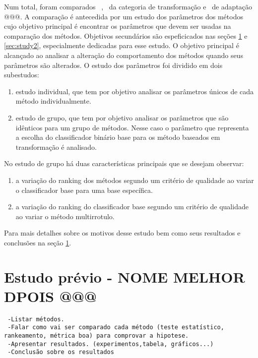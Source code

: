 Num total, foram comparados \Nml~\MML, \NmlT~da categoria de transformação e \NmlA~de adaptação @@@.
A comparação é antecedida por um estudo dos parâmetros dos métodos
cujo objetivo principal é encontrar os parâmetros que devem ser usadas na comparação dos métodos. Objetivos secundários são
espeficicados nas seções \ref{sec:study1} e \ref{sec:study2}, especialmente dedicadas para esse estudo.
O objetivo principal é alcançado ao analisar a alteração do comportamento dos métodos quando seus parâmetros são alterados.
O estudo dos parâmetros foi dividido em dois subestudos:
\begin{enumerate}
 \item estudo individual, que tem por objetivo analisar os parâmetros únicos de cada método individualmente.
  \item estudo de grupo, que tem por objetivo analisar os parâmetros que são idênticos para um grupo de métodos.
  Nesse caso o parâmetro que representa a escolha do classificador binário base para os método baseados em transformação é
  analisado. 
\end{enumerate}
 No estudo de grupo há duas características principais que se desejam observar:
  
  \begin{enumerate}
  \item a variação do ranking dos métodos segundo um critério de qualidade ao variar o classificador base
  para uma base específica.
  \item a variação do ranking do classificador base segundo um critério de qualidade ao variar o método multirrotulo.
  \end{enumerate}

  Para mais detalhes sobre os motivos desse estudo bem como seus resultados e conclusões na seção \ref{sec:study1}.
  

\section{Estudo prévio - NOME MELHOR DPOIS @@@}
\label{sec:study1}
\begin{verbatim}
 -Listar métodos.
 -Falar como vai ser comparado cada método (teste estatístico, rankeamento, métrica boa) para comprovar a hipotese.
 -Apresentar resultados. (experimentos,tabela, gráficos...)
 -Conclusão sobre os resultados
\end{verbatim}

